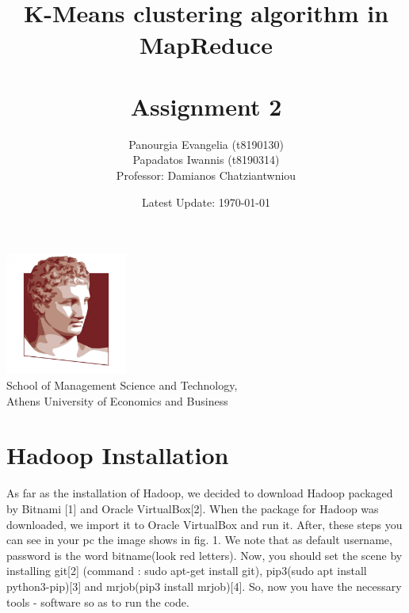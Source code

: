 \documentclass[11pt]{article}
\begin{document}
	\begin{titlepage}
		\title{\hrulefill\\
			\vspace{5mm}
			{\Huge \textbf{K-Means clustering algorithm in MapReduce}} \\ \hrulefill\\
			\vspace{10mm}
			{\Large {{Assignment 2}
		}}}
		\author{Panourgia Evangelia (t8190130)\\
			Papadatos Iwannis (t8190314)\\
			Professor: Damianos Chatziantwniou}
		\date{Latest Update: \today}
		\maketitle
		
		\thispagestyle{empty}
		\begin{center}
			\includegraphics[width=0.3\textwidth]{./aueblogo.jpg}\\
			\vspace{10mm}
			School of Management Science and Technology,\\ Athens University of Economics and Business
		\end{center}
	\end{titlepage}
	\noindent
	
	\tableofcontents	
	
	\section{Hadoop Installation}
	As far as the installation of Hadoop, we decided to download Hadoop packaged by Bitnami [1] and Oracle VirtualBox[2].  When the package for Hadoop was downloaded, we import it to  Oracle VirtualBox and run it. After, these steps you can see in your pc the image shows in fig. 1. We note that as default username, password is the word bitname(look red letters). 
	Now, you should set the scene by installing git[2] (command : sudo apt-get install git), pip3(sudo apt install python3-pip)[3] and mrjob(pip3 install mrjob)[4]. So, now you have the necessary tools - software so as to run the code. 
    
\end{document}
